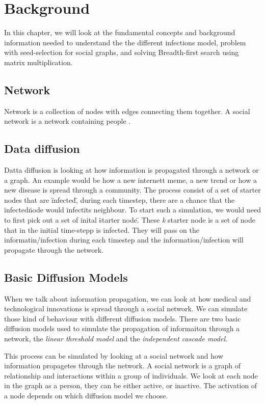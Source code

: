 \chapter{Background} 

In this chapter, we will look at the fundamental concepts and background information needed to understand the the different infections model, problem with seed-selection for social graphs, and solving Breadth-first search using matrix multiplication.

\section{Network}
Network is a collection of nodes with edges connecting them together\cite{TheStrucandcomplex}. A social network is a network containing people . 

\section{Data diffusion}
Datta diffusion is looking at how information is propagated through a network or a graph. An example would be how a new internett meme, a new trend or how a new disease is spread through a community. The process consist of a set of starter nodes that are \"infected\", during each timestep, there are a chance that the \"infected\" node would \"infect\" its neighbour. To start such a simulation, we would need to first pick out a set of inital \"starter node\". These {\it k} starter node is a set of node that in the initial time-stepp is infected. They will pass on the informatin/infection during each timestep and the information/infection will propagate through the network.

\section{Basic Diffusion Models}
When we talk about information propagation, we can look at how medical and technological innovations is spread through a social network. We can simulate those kind of behaviour with different diffusion models. There are two basic diffusion models used to simulate the propagation of informaiton through a network\cite{kempe}, the {\it linear threshold model} and the {\it independent cascade model}\cite{kempe}.

This process can be simulated by looking at a social network and how information propagetes through the network. A social network is a graph of relationship and interactions within a group of individuals. 
We look at each node in the graph as a person, they can be either active, or inactive. The activation of a node depends on which diffusion model we choose.

